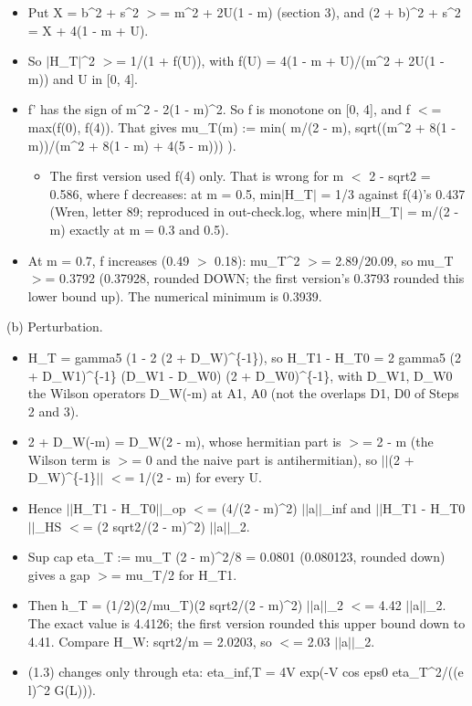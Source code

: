 \documentclass[11pt,a4paper]{article}
\begin{document}
\begin{itemize}
\item{} Put X = b\textasciicircum{}2 + s\textasciicircum{}2 $>$= m\textasciicircum{}2 + 2U(1 - m) (section 3), and (2 + b)\textasciicircum{}2 + s\textasciicircum{}2 = X + 4(1 - m + U).
\item{} So $|$H\_T$|$\textasciicircum{}2 $>$= 1/(1 + f(U)), with f(U) = 4(1 - m + U)/(m\textasciicircum{}2 + 2U(1 - m)) and U in [0, 4].
\item{} f' has the sign of m\textasciicircum{}2 - 2(1 - m)\textasciicircum{}2. So f is monotone on [0, 4], and f $<$= max(f(0), f(4)). That gives
mu\_T(m) := min( m/(2 - m), sqrt((m\textasciicircum{}2 + 8(1 - m))/(m\textasciicircum{}2 + 8(1 - m) + 4(5 - m))) ).
\begin{itemize}
\item{} The first version used f(4) only. That is wrong for m $<$ 2 - sqrt2 = 0.586, where f decreases: at m = 0.5,
min$|$H\_T$|$ = 1/3 against f(4)'s 0.437 (Wren, letter 89; reproduced in out-check.log, where min$|$H\_T$|$ = m/(2 - m)
exactly at m = 0.3 and 0.5).
\end{itemize}

\item{} At m = 0.7, f increases (0.49 $>$ 0.18): mu\_T\textasciicircum{}2 $>$= 2.89/20.09, so mu\_T $>$= 0.3792 (0.37928, rounded DOWN; the first
version's 0.3793 rounded this lower bound up). The numerical minimum is 0.3939.
\end{itemize}

(b) Perturbation.

\begin{itemize}
\item{} H\_T = gamma5 (1 - 2 (2 + D\_W)\textasciicircum{}\{-1\}), so H\_T1 - H\_T0 = 2 gamma5 (2 + D\_W1)\textasciicircum{}\{-1\} (D\_W1 - D\_W0) (2 + D\_W0)\textasciicircum{}\{-1\}, with
D\_W1, D\_W0 the Wilson operators D\_W(-m) at A1, A0 (not the overlaps D1, D0 of Steps 2 and 3).
\item{} 2 + D\_W(-m) = D\_W(2 - m), whose hermitian part is $>$= 2 - m (the Wilson term is $>$= 0 and the naive part is
antihermitian), so $|$$|$(2 + D\_W)\textasciicircum{}\{-1\}$|$$|$ $<$= 1/(2 - m) for every U.
\item{} Hence $|$$|$H\_T1 - H\_T0$|$$|$\_op $<$= (4/(2 - m)\textasciicircum{}2) $|$$|$a$|$$|$\_inf and $|$$|$H\_T1 - H\_T0$|$$|$\_HS $<$= (2 sqrt2/(2 - m)\textasciicircum{}2) $|$$|$a$|$$|$\_2.
\item{} Sup cap eta\_T := mu\_T (2 - m)\textasciicircum{}2/8 = 0.0801 (0.080123, rounded down) gives a gap $>$= mu\_T/2 for H\_T1.
\item{} Then h\_T = (1/2)(2/mu\_T)(2 sqrt2/(2 - m)\textasciicircum{}2) $|$$|$a$|$$|$\_2 $<$= 4.42 $|$$|$a$|$$|$\_2. The exact value is 4.4126; the first version
rounded this upper bound down to 4.41. Compare H\_W: sqrt2/m = 2.0203, so $<$= 2.03 $|$$|$a$|$$|$\_2.
\item{} (1.3) changes only through eta: eta\_inf,T = 4V exp(-V cos eps0 eta\_T\textasciicircum{}2/((e l)\textasciicircum{}2 G(L))).
\end{itemize}
\end{document}
